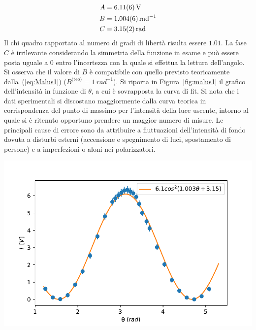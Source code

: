 \documentclass[10pt,oneside,a4paper]{article}
\newenvironment{Figure}
  {\par\medskip\noindent\minipage{\linewidth}}
  {\endminipage\par\medskip}
\begin{document}
\begin{multicols}{2}
\[
\begin{aligned}
A &= \SI{6.11 \pm 0.06}{V} \\
B &= \SI{1.004 \pm 0.006}{rad^{-1}} \\
C &= \SI{3.15 \pm 0.02}{rad}
\end{aligned}
\]
Il chi quadro rapportato al numero di gradi di libertà risulta essere $1.01$. La fase $C$ è irrilevante considerando la simmetria della funzione in esame e può essere posta uguale a $0$ entro l'incertezza con la quale si effettua la lettura dell'angolo. Si osserva che il valore di $B$ è compatibile con quello previsto teoricamente dalla~(\ref{eq:Malus1}) ($B^{\text{(teo)}} = \SI{1}{rad^{-1}}$).
Si riporta in Figura~\ref{fig:malus1} il grafico dell'intensità in funzione di $\theta$, a cui è sovrapposta la curva di fit. Si nota che i dati sperimentali si discostano maggiormente dalla curva teorica in corrispondenza del punto di massimo per l'intensità della luce uscente, intorno al quale si è ritenuto opportuno prendere un maggior numero di misure.
Le principali cause di errore sono da attribuire a fluttuazioni dell'intensità di fondo dovuta a disturbi esterni (accensione e spegnimento di luci, spostamento di persone) e a imperfezioni o aloni nei polarizzatori.


\begin{Figure}
	\begin{center}
	\includegraphics[width=\linewidth]{malus1.pdf}
	\label{fig:malus1}
	\end{center}
\end{Figure}


\end{multicols}
\end{document}
